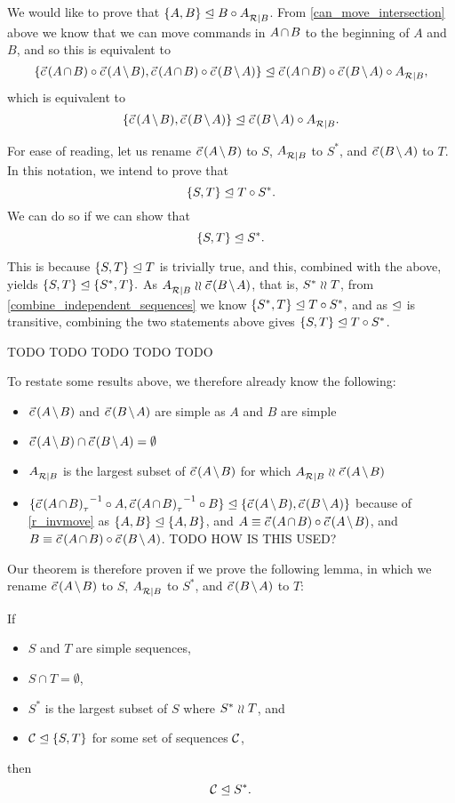 \bigskip

\noindent
We would like to prove that ${\{{A,B}\}}\trianglelefteq{B\circ{A}^{}_{\mathcal{R}|{B}}}$.
From \cref{can_move_intersection} above we know that we can move commands in $\acbnp$
to the beginning of $A$ and $B$, and so this is equivalent to
\[ \worksmbx{\acb\cc\amb, \acb\cc\bma}{\acb\cc \bma\cc \reca}, \]
which is equivalent to
\[ \worksmbx{\amb, \bma}{\bma\cc \reca}. \]

For ease of reading, let us rename
$\amb$ to $S$,
${A}^{}_{\mathcal{R}|{B}}$ to $S^*$,
and $\bma$ to $T$.
In this notation, we intend to prove that
\[ {\{{S,T}\}}\trianglelefteq{T\circ S^*}. \]
We can do so if we can show that
\[ {\{{S,T}\}}\trianglelefteq{S^*}. \]

This is because 
${\{{S,T}\}}\trianglelefteq{T}$ is trivially true, and this, combined with the above,
yields 
$ {\{{S,T}\}}\trianglelefteq{\{{S^*,T}\}}. $
As $\reca\indep\bma$, that is, $S^*\mathrel{\wr\wr} T$,
from \cref{combine_independent_sequences}
we know
$ {\{{S^*,T}\}}\trianglelefteq{T\circ S^*}, $
and as $\trianglelefteq$ is transitive, combining the two statements above
gives ${\{{S,T}\}}\trianglelefteq{T\circ S^*}$.

\bigskip

TODO TODO TODO TODO TODO

\noindent
To restate some results above, we therefore already know the following:
\begin{itemize}
\item $\amb$ and $\bma$ are simple as $A$ and $B$ are simple
\item $\amb \cap \bma = \emptyset$
\item ${A}^{}_{\mathcal{R}|{B}}$ is the largest subset of $\amb$ for which $\reca\indep\amb$
\item $\worksmbb{\acbi\cc A,\acbi\cc B}{\amb, \bma}$ 
because of \cref{r_invmove}
as ${\{{A,B}\}}\trianglelefteq{\{{A,B}\}}$,
and $A\equiv\acb\cc\amb$, and $B\equiv\acb\cc\bma$.
TODO HOW IS THIS USED?
\end{itemize}

Our theorem is therefore proven if we prove the following lemma,
in which we rename $\amb$ to $S$, ${A}^{}_{\mathcal{R}|{B}}$ to $S^*$, and $\bma$ to $T$:
\newcommand{\condSimple}{(c1)}
\newcommand{\condDisj}{(c2)}
\newcommand{\condApr}{(c3)}
\newcommand{\condWork}{(c4)}
\begin{mylem}\label{reconciliation_correct_part}
If
   \begin{itemize}
   \item[\condSimple] $S$ and $T$ are simple sequences,
   \item[\condDisj] $S\cap T=\emptyset$,
   \item[\condApr] $S^*$ is the largest subset of $S$ where $S^*\mathrel{\wr\wr} T$, and
   \item[\condWork] ${\mathcal{C}}\trianglelefteq{\{{S,T}\}}$ for some set of sequences $\mathcal{C}$,
   \end{itemize}
then
\[ {\mathcal{C}}\trianglelefteq{S^*}. \]
\end{mylem}

